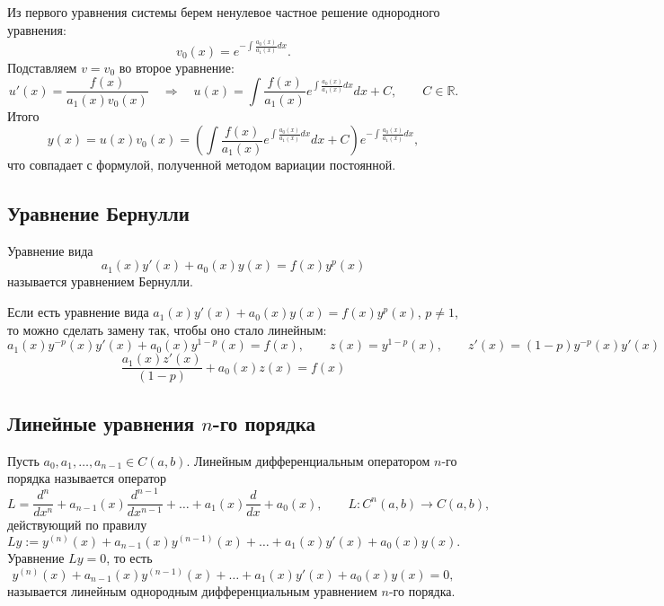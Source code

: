 \documentclass[12pt]{article}
\begin{document}
    \begin{example}
    	Из первого уравнения системы берем ненулевое частное решение однородного уравнения:
    	\[
    		v_0(x) = e^{-\int \frac{a_0(x)}{a_1(x)} dx}.
    	\]
    	Подставляем $v = v_0$ во второе уравнение:
    	\[
    		u'(x) = \dfrac{f(x)}{a_1(x) v_0(x)} \quad \Longrightarrow \quad u(x) = \int \dfrac{f(x)}{a_1(x)} e^{\int \frac{a_0(x)}{a_1(x)} dx} dx + C, \qquad C \in \mathbb{R}.
    	\]
    	Итого
    	\[
    		y(x) = u(x) v_0(x) = \left( \int \dfrac{f(x)}{a_1(x)} e^{\int \frac{a_0(x)}{a_1(x)} dx} dx + C \right) e^{-\int \frac{a_0(x)}{a_1(x)} dx},
    	\]
    	что совпадает с формулой, полученной методом вариации постоянной.
    \end{example}

	\subsection{Уравнение Бернулли}

	\begin{definition}
		Уравнение вида
		\[
			a_1(x)y'(x)+a_0(x)y(x)=f(x)y^p(x)
		\]
		называется уравнением Бернулли.
	\end{definition}

	\begin{statement}
		Если есть уравнение вида $a_1(x)y'(x)+a_0(x)y(x)=f(x)y^p(x)$, $p\ne 1$, то можно сделать замену так, чтобы оно стало линейным:
		\[
			a_1(x)y^{-p}(x)y'(x)+a_0(x)y^{1-p}(x)=f(x), \qquad z(x)=y^{1-p}(x), \qquad z'(x)=(1-p)y^{-p}(x)y'(x)
		\]
		\[
			\frac{a_1(x)z'(x)}{(1-p)}+a_0(x)z(x)=f(x)
		\]
	\end{statement}

	\subsection{Линейные уравнения $n$-го порядка}

	\begin{definition}
		Пусть $a_0, a_1, \dots, a_{n-1} \in C(a, b)$. Линейным дифференциальным оператором $n$-го порядка называется оператор
		\[
			L = \dfrac{d^n}{dx^n} + a_{n-1}(x) \dfrac{d^{n-1}}{dx^{n-1}} + \dots + a_1(x) \dfrac{d}{dx} + a_0(x), \qquad L: C^n(a, b) \rightarrow C(a, b),
		\]
		действующий по правилу
		\[
			Ly := y^{(n)}(x) + a_{n-1}(x) y^{(n-1)}(x) + \dots + a_1(x) y'(x) + a_0(x) y(x).
		\]
		Уравнение $Ly = 0$, то есть
		\[
			y^{(n)}(x) + a_{n-1}(x) y^{(n-1)}(x) + \dots + a_1(x) y'(x) + a_0(x) y(x) = 0,
		\]
		называется линейным однородным дифференциальным уравнением $n$-го порядка.
	\end{definition}
\end{document}
